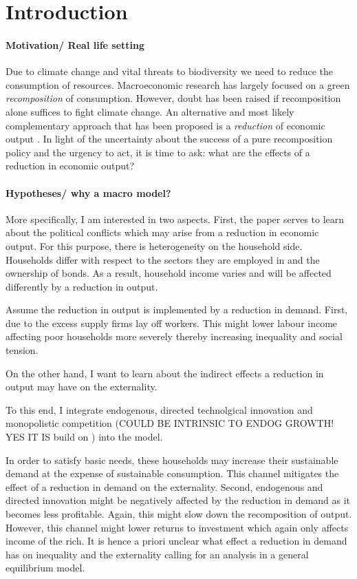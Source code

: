 \section{Introduction}

\paragraph{Motivation/ Real life setting}
Due to climate change and vital threats to biodiversity we need to reduce the consumption of resources. %
Macroeconomic research has largely focused on a green \textit{recomposition} of consumption. However, doubt has been raised if recomposition alone suffices to fight climate change. An alternative and most likely complementary approach that has been proposed is a \textit{reduction} of economic output \citep[e.g.][]{Dasgupta2021, GoughCANGREEN, Naqvi2017FiftyPollutants}. %
In light of the uncertainty about the success of a pure recomposition policy and the urgency to act, it is time to ask: what are the effects of a reduction in economic output? 

\paragraph{Hypotheses/ why a macro model?}
More specifically, I am interested in two aspects. First, the paper serves to learn about the political conflicts which may arise from a reduction in economic output. For this purpose, there is heterogeneity on the household side. 
Households differ with respect to the sectors they are employed in and the ownership of bonds. As a result, household income varies and will be affected differently by a reduction in output. 

Assume the reduction in output is implemented by a reduction in demand. First, due to the excess supply firms lay off workers. This might lower labour income affecting poor households more severely thereby increasing inequality and social tension.   

On the other hand, I want to learn about the indirect effects a reduction in output may have on the externality. 

To this end, I integrate  endogenous, directed technolgical innovation and monopolistic competition (COULD BE INTRINSIC TO ENDOG GROWTH! YES IT IS \ar build on \cite{Acemoglu2012TheChange}) into the model.


In order to satisfy basic needs, these households may increase their sustainable demand at the expense of sustainable consumption. This channel mitigates the effect of a reduction in demand on the externality. 
Second, endogenous and directed innovation might be negatively affected by the reduction in demand as it becomes less profitable. Again, this might slow down the recomposition of output. However, this channel might lower returns to investment which again only affects income of the rich. 
It is hence a priori unclear what effect a reduction in demand has on inequality and the externality calling for an analysis in a general equilibrium model. 

